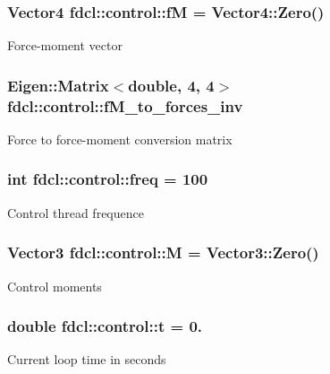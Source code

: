 \subsubsection[{\texorpdfstring{fM}{fM}}]{\setlength{\rightskip}{0pt plus 5cm}Vector4 fdcl\+::control\+::fM = Vector4\+::\+Zero()}\hypertarget{classfdcl_1_1control_ac27cf9d04a9f9157eb275eaac60c066d}{}\label{classfdcl_1_1control_ac27cf9d04a9f9157eb275eaac60c066d}
Force-\/moment vector 
\subsubsection[{\texorpdfstring{f\+M\+\_\+to\+\_\+forces\+\_\+inv}{fM_to_forces_inv}}]{\setlength{\rightskip}{0pt plus 5cm}Eigen\+::\+Matrix$<$double, 4, 4$>$ fdcl\+::control\+::f\+M\+\_\+to\+\_\+forces\+\_\+inv}\hypertarget{classfdcl_1_1control_ae111bb213798d710e4ce5b0392a8ab18}{}\label{classfdcl_1_1control_ae111bb213798d710e4ce5b0392a8ab18}
Force to force-\/moment conversion matrix 
\subsubsection[{\texorpdfstring{freq}{freq}}]{\setlength{\rightskip}{0pt plus 5cm}int fdcl\+::control\+::freq = 100}\hypertarget{classfdcl_1_1control_addf63b932fa19bddee426be333843fcb}{}\label{classfdcl_1_1control_addf63b932fa19bddee426be333843fcb}
Control thread frequence 
\subsubsection[{\texorpdfstring{M}{M}}]{\setlength{\rightskip}{0pt plus 5cm}Vector3 fdcl\+::control\+::M = Vector3\+::\+Zero()}\hypertarget{classfdcl_1_1control_afdd2524a3a5bb05b7235fdca829be124}{}\label{classfdcl_1_1control_afdd2524a3a5bb05b7235fdca829be124}
Control moments 
\subsubsection[{\texorpdfstring{t}{t}}]{\setlength{\rightskip}{0pt plus 5cm}double fdcl\+::control\+::t = 0.}\hypertarget{classfdcl_1_1control_a85f288d9d87aeb6d6d5509235c4648d9}{}\label{classfdcl_1_1control_a85f288d9d87aeb6d6d5509235c4648d9}
Current loop time in seconds 
